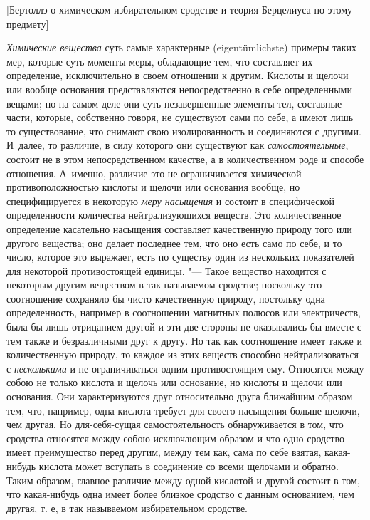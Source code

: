 %
  {[Бертоллэ о химическом избирательном
    сродстве и теория Берцелиуса по этому предмету]}

{\em Химические вещества} суть самые характерные
(eigentümlichste) примеры таких мер, которые суть моменты меры, обладающие
тем, что составляет их определение, исключительно в своем отношении к
другим. Кислоты и щелочи или вообще основания представляются
непосредственно в себе определенными вещами; но на самом деле они суть
незавершенные элементы тел, составные части, которые, собственно говоря, не
существуют сами по себе, а имеют лишь то существование, что снимают свою
изолированность и соединяются с другими. И~далее, то различие, в силу
которого они существуют как {\em самостоятельные},
состоит не в этом непосредственном качестве, а в количественном роде и
способе отношения. А~именно, различие это не ограничивается химической
противоположностью кислоты и щелочи или основания вообще, но
специфицируется в некоторую {\em меру насыщения} и
состоит в специфической определенности количества нейтрализующихся веществ.
Это количественное определение касательно насыщения составляет качественную
природу того или другого вещества; оно делает последнее тем, что оно есть
само по себе, и то число, которое это выражает, есть по существу один из
нескольких показателей для некоторой противостоящей единицы. "--- Такое
вещество находится с некоторым другим веществом в так называемом сродстве;
поскольку это соотношение сохраняло бы чисто качественную природу,
постольку одна определенность, например в соотношении магнитных полюсов или
электричеств, была бы лишь отрицанием другой и эти две стороны не
оказывались бы вместе с тем также и безразличными друг к другу. Но так как
соотношение имеет также и количественную природу, то каждое из этих веществ
способно нейтрализоваться с {\em несколькими} и не
ограничиваться одним противостоящим ему. Относятся между собою не только
кислота и щелочь или основание, но кислоты и щелочи или основания. Они
характеризуются друг относительно друга ближайшим образом тем, что,
например, одна кислота требует для своего насыщения больше щелочи, чем
другая. Но для-себя-сущая самостоятельность обнаруживается в том, что
сродства относятся между собою исключающим образом и что одно сродство
имеет преимущество перед другим, между тем как, сама по себе взятая,
какая-нибудь кислота может вступать в соединение со всеми щелочами и
обратно. Таким образом, главное различие между одной кислотой и другой
состоит в том, что какая-нибудь одна имеет более близкое сродство с данным
основанием, чем другая, т. е, в так называемом избирательном сродстве.


